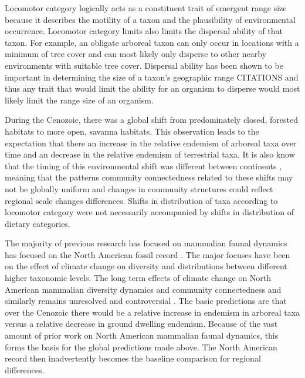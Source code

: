 \documentclass[12pt,letterpaper]{article}
\begin{document}
Locomotor category logically acts as a constituent trait of emergent range size because it describes the motility of a taxon and the plausibility of environmental occurrence. Locomotor category limits also limits the dispersal ability of that taxon. For example, an obligate arboreal taxon can only occur in locations with a minimum of tree cover and can most likely only disperse to other nearby environments with suitable tree cover. Dispersal ability has been shown to be important in determining the size of a taxon's geographic range CITATIONS and thus any trait that would limit the ability for an organism to disperse would most likely limit the range size of an organism.

During the Cenozoic, there was a global shift from predominately closed, forested habitats to more open, savanna habitats. This observation leads to the expectation that there an increase in the relative endemism of arboreal taxa over time and an decrease in the relative endemism of terrestrial taxa. It is also know that the timing of this environmental shift was different between continents \citep{Stromberg2005,Stromberg2013}, meaning that the patterns community connectedness related to these shifts may not be globally uniform and changes in community structures could reflect regional scale changes differences. Shifts in distribution of taxa according to locomotor category were not necessarily accompanied by shifts in distribution of dietary categories.

The majority of previous research has focused on mammalian faunal dynamics has focused on the North American fossil record \citep{Alroy2000g,Alroy1996a,Alroy1998,Barnosky2001a,Simpson1944,Simpson1953,Badgley2013,Blois2009,Figueirido2012,Gunnell1995,Hadly2001}. The major focuses have been on the effect of climate change on diversity and distributions between different higher taxonomic levels. The long term effects of climate change on North American mammalian diversity dynamics and community connectedness and similarly remains unresolved and controversial \citep{Alroy2000g,Blois2009,Figueirido2012,Barnosky2001a}. The basic predictions are that over the Cenozoic there would be a relative increase in endemism in arboreal taxa versus a relative decrease in ground dwelling endemism. Because of the vast amount of prior work on North American mammalian faunal dynamics, this forms the basis for the global predictions made above. The North American record then inadvertently becomes the baseline comparison for regional differences.
\end{document}
